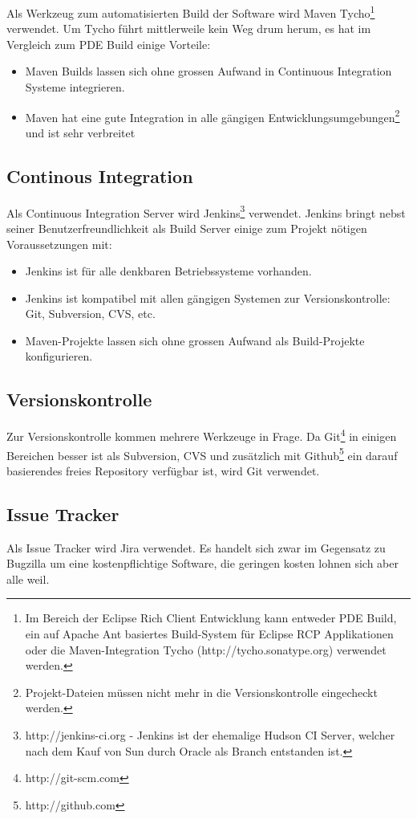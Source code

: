 Als Werkzeug zum automatisierten Build der Software wird Maven Tycho\footnote{Im Bereich der Eclipse Rich Client Entwicklung kann entweder PDE Build, ein auf Apache Ant basiertes Build-System für Eclipse RCP Applikationen\cite{vogelZapfPdeBuild} oder die Maven-Integration Tycho (http://tycho.sonatype.org) verwendet werden.} verwendet. Um Tycho führt mittlerweile kein Weg drum herum, es hat im Vergleich zum PDE Build einige Vorteile:
\begin{itemize}
	\item Maven Builds lassen sich ohne grossen Aufwand in Continuous Integration Systeme integrieren.
	\item Maven hat eine gute Integration in alle gängigen Entwicklungsumgebungen\footnote{Projekt-Dateien müssen nicht mehr in die Versionskontrolle eingecheckt werden.} und ist sehr verbreitet
\end{itemize}

\subsection{Continous Integration}
Als Continuous Integration Server wird Jenkins\footnote{http://jenkins-ci.org - Jenkins ist der ehemalige Hudson CI Server, welcher nach dem Kauf von Sun durch Oracle als Branch entstanden ist.} verwendet. Jenkins bringt nebst seiner Benutzerfreundlichkeit als Build Server einige zum Projekt nötigen Voraussetzungen mit:
\begin{itemize}
	\item Jenkins ist für alle denkbaren Betriebssysteme vorhanden.
	\item Jenkins ist kompatibel mit allen gängigen Systemen zur Versionskontrolle: Git, Subversion, CVS, etc.
	\item Maven-Projekte lassen sich ohne grossen Aufwand als Build-Projekte konfigurieren.
\end{itemize}

\subsection{Versionskontrolle}
Zur Versionskontrolle kommen mehrere Werkzeuge in Frage. Da Git\footnote{http://git-scm.com} in einigen Bereichen besser ist als Subversion, CVS und zusätzlich mit Github\footnote{http://github.com} ein darauf basierendes freies Repository verfügbar ist, wird Git verwendet.
\subsection{Issue Tracker}
Als Issue Tracker wird Jira verwendet. Es handelt sich zwar im Gegensatz zu Bugzilla um eine kostenpflichtige Software, die geringen kosten lohnen sich aber alle weil. 

